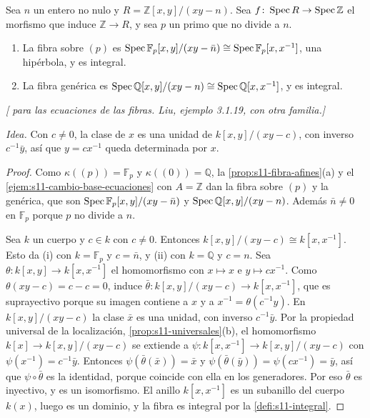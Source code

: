 \begin{ejem}[La familia \(xy=n\)]
\label{ejem:s11-familia-hiperbola}
Sea \(n\) un entero no nulo y \(R=\mathbb Z[x,y]/(xy-n)\). Sea \(f\colon\operatorname{Spec} R\to\operatorname{Spec}\mathbb Z\) el morfismo que induce \(\mathbb Z\to R\), y sea \(p\) un primo que no divide a \(n\).
\begin{enumerate}[label=(\roman*)]
\item La fibra sobre \((p)\) es \(\operatorname{Spec}\mathbb F_p[x,y]/(xy-\bar n)\cong\operatorname{Spec}\mathbb F_p[x,x^{-1}]\), una hipérbola, y es integral.
\item La fibra genérica es \(\operatorname{Spec}\mathbb Q[x,y]/(xy-n)\cong\operatorname{Spec}\mathbb Q[x,x^{-1}]\), y es integral.
\end{enumerate}
\emph{[ para las ecuaciones de las fibras. Liu, ejemplo 3.1.19, con otra familia.]}
\end{ejem}

\emph{Idea.} Con \(c\ne0\), la clase de \(x\) es una unidad de \(k[x,y]/(xy-c)\), con inverso \(c^{-1}\bar y\), así que \(y=cx^{-1}\) queda determinada por \(x\).

\begin{proof}
Como \(\kappa((p))=\mathbb F_p\) y \(\kappa((0))=\mathbb Q\), la \cref{prop:s11-fibra-afines}(a) y el \cref{ejem:s11-cambio-base-ecuaciones} con \(A=\mathbb Z\) dan la fibra sobre \((p)\) y la genérica, que son \(\operatorname{Spec}\mathbb F_p[x,y]/(xy-\bar n)\) y \(\operatorname{Spec}\mathbb Q[x,y]/(xy-n)\). Además \(\bar n\ne0\) en \(\mathbb F_p\) porque \(p\) no divide a \(n\).

Sea \(k\) un cuerpo y \(c\in k\) con \(c\ne0\). Entonces \(k[x,y]/(xy-c)\cong k[x,x^{-1}]\). Esto da (i) con \(k=\mathbb F_p\) y \(c=\bar n\), y (ii) con \(k=\mathbb Q\) y \(c=n\). Sea \(\theta\colon k[x,y]\to k[x,x^{-1}]\) el homomorfismo con \(x\mapsto x\) e \(y\mapsto cx^{-1}\). Como \(\theta(xy-c)=c-c=0\), induce \(\bar\theta\colon k[x,y]/(xy-c)\to k[x,x^{-1}]\), que es suprayectivo porque su imagen contiene a \(x\) y a \(x^{-1}=\theta(c^{-1}y)\). En \(k[x,y]/(xy-c)\) la clase \(\bar x\) es una unidad, con inverso \(c^{-1}\bar y\). Por la propiedad universal de la localización, \cref{prop:s11-universales}(b), el homomorfismo \(k[x]\to k[x,y]/(xy-c)\) se extiende a \(\psi\colon k[x,x^{-1}]\to k[x,y]/(xy-c)\) con \(\psi(x^{-1})=c^{-1}\bar y\). Entonces \(\psi(\bar\theta(\bar x))=\bar x\) y \(\psi(\bar\theta(\bar y))=\psi(cx^{-1})=\bar y\), así que \(\psi\circ\bar\theta\) es la identidad, porque coincide con ella en los generadores. Por eso \(\bar\theta\) es inyectivo, y es un isomorfismo. El anillo \(k[x,x^{-1}]\) es un subanillo del cuerpo \(k(x)\), luego es un dominio, y la fibra es integral por la \cref{defi:s11-integral}.
\end{proof}

